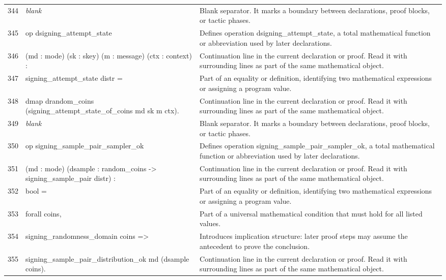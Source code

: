 \documentclass[10pt]{article}
\begin{document}
\begin{longtable}{r L{0.53\textwidth} L{0.37\textwidth}}
344 & {\ttfamily\scriptsize \emph{blank}} & Blank separator.  It marks a boundary between declarations, proof blocks, or tactic phases. \\
345 & {\ttfamily\scriptsize op dsigning\_attempt\_state} & Defines operation dsigning\_attempt\_state, a total mathematical function or abbreviation used by later declarations. \\
346 & {\ttfamily\scriptsize    (md : mode) (sk : skey) (m : message) (ctx : context) :} & Continuation line in the current declaration or proof.  Read it with surrounding lines as part of the same mathematical object. \\
347 & {\ttfamily\scriptsize    signing\_attempt\_state distr =} & Part of an equality or definition, identifying two mathematical expressions or assigning a program value. \\
348 & {\ttfamily\scriptsize   dmap drandom\_coins (signing\_attempt\_state\_of\_coins md sk m ctx).} & Continuation line in the current declaration or proof.  Read it with surrounding lines as part of the same mathematical object. \\
349 & {\ttfamily\scriptsize \emph{blank}} & Blank separator.  It marks a boundary between declarations, proof blocks, or tactic phases. \\
350 & {\ttfamily\scriptsize op signing\_sample\_pair\_sampler\_ok} & Defines operation signing\_sample\_pair\_sampler\_ok, a total mathematical function or abbreviation used by later declarations. \\
351 & {\ttfamily\scriptsize    (md : mode) (dsample : random\_coins -> signing\_sample\_pair distr) :} & Continuation line in the current declaration or proof.  Read it with surrounding lines as part of the same mathematical object. \\
352 & {\ttfamily\scriptsize    bool =} & Part of an equality or definition, identifying two mathematical expressions or assigning a program value. \\
353 & {\ttfamily\scriptsize   forall coins,} & Part of a universal mathematical condition that must hold for all listed values. \\
354 & {\ttfamily\scriptsize     signing\_randomness\_domain coins =>} & Introduces implication structure: later proof steps may assume the antecedent to prove the conclusion. \\
355 & {\ttfamily\scriptsize     signing\_sample\_pair\_distribution\_ok md (dsample coins).} & Continuation line in the current declaration or proof.  Read it with surrounding lines as part of the same mathematical object. \\

\end{longtable}
\end{document}
